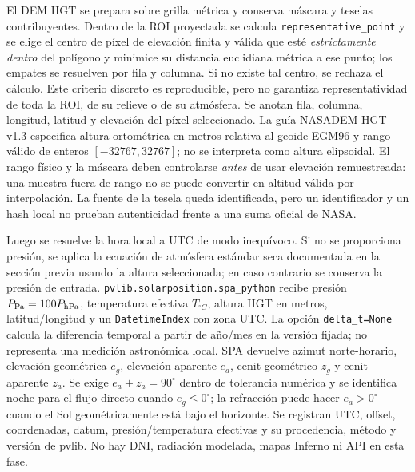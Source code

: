 \documentclass[11pt,a4paper]{article}
\begin{document}
El DEM HGT se prepara sobre grilla métrica y conserva máscara y teselas contribuyentes. Dentro de la ROI proyectada se calcula \texttt{representative\_point} y se elige el centro de píxel de elevación finita y válida que esté \emph{estrictamente dentro} del polígono y minimice su distancia euclidiana métrica a ese punto; los empates se resuelven por fila y columna. Si no existe tal centro, se rechaza el cálculo. Este criterio discreto es reproducible, pero no garantiza representatividad de toda la ROI, de su relieve o de su atmósfera. Se anotan fila, columna, longitud, latitud y elevación del píxel seleccionado. La guía NASADEM HGT v1.3 especifica altura ortométrica en metros relativa al geoide EGM96 y rango válido de enteros $[-32767,32767]$; no se interpreta como altura elipsoidal. El rango físico y la máscara deben controlarse \emph{antes} de usar elevación remuestreada: una muestra fuera de rango no se puede convertir en altitud válida por interpolación. La fuente de la tesela queda identificada, pero un identificador y un hash local no prueban autenticidad frente a una suma oficial de NASA.

Luego se resuelve la hora local a UTC de modo inequívoco. Si no se proporciona presión, se aplica la ecuación de atmósfera estándar seca documentada en la sección previa usando la altura seleccionada; en caso contrario se conserva la presión de entrada. \texttt{pvlib.solarposition.spa\_python} recibe presión $P_{\rm Pa}=100 P_{\rm hPa}$, temperatura efectiva $T_{^\circ\!C}$, altura HGT en metros, latitud/longitud y un \texttt{DatetimeIndex} con zona UTC. La opción \texttt{delta\_t=None} calcula la diferencia temporal a partir de año/mes en la versión fijada; no representa una medición astronómica local. SPA devuelve azimut norte-horario, elevación geométrica $e_g$, elevación aparente $e_a$, cenit geométrico $z_g$ y cenit aparente $z_a$. Se exige $e_a+z_a=90^\circ$ dentro de tolerancia numérica y se identifica noche para el flujo directo cuando $e_g\leq 0^\circ$; la refracción puede hacer $e_a>0^\circ$ cuando el Sol geométricamente está bajo el horizonte. Se registran UTC, offset, coordenadas, datum, presión/temperatura efectivas y su procedencia, método y versión de pvlib. No hay DNI, radiación modelada, mapas Inferno ni API en esta fase.
\end{document}
